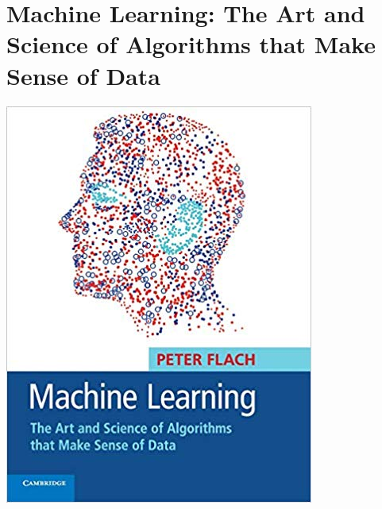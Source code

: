\documentclass{tufte-handout}
\makeatletter
\newcommand{\varcaption}[2][0pt]{%
  \gsetlength{\@tufte@caption@vertical@offset}{-#1}%
  \gdef\@tufte@stored@varcaption{#2}%
}
\gdef\@tufte@stored@varcaption{} %
\makeatother
\begin{document}
\section*{Machine Learning: The Art and Science of Algorithms that Make Sense of Data}
\begin{marginfigure}[3\baselineskip]
   \includegraphics[width=\linewidth]{images/machine_learning.jpg}
   \varcaption{\href{https://www.cambridge.org/us/academic/subjects/computer-science/pattern-recognition-and-machine-learning/machine-learning-art-and-science-algorithms-make-sense-data?format=PB&isbn=9781107422223}{Publisher Link}, \href{https://www.amazon.com/Machine-Learning-Science-Algorithms-Sense/dp/1107422221/}{Amazon Link}}
\end{marginfigure}
\end{document}
